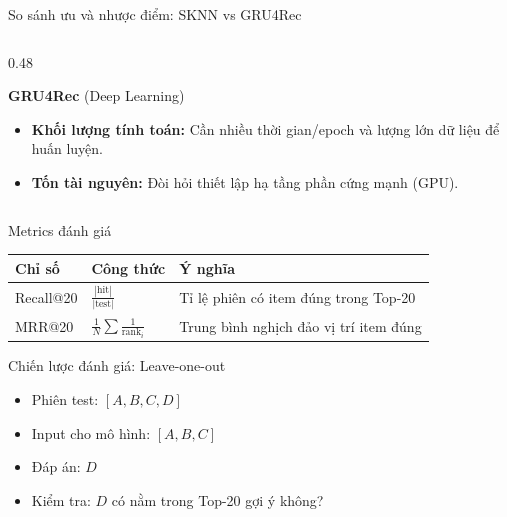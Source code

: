 \documentclass[aspectratio=169, 11pt]{beamer}
\begin{document}
\begin{frame}{So sánh ưu và nhược điểm: SKNN vs GRU4Rec}
\begin{columns}[t]
\begin{column}{0.48\textwidth}
\begin{block}{\textbf{GRU4Rec} (Deep Learning)}
                \vspace{0.03cm}
                \textbf{\color{red!70!black}{Nhược điểm:}}
                \begin{itemize}
                    \item \textbf{Khối lượng tính toán:} Cần nhiều thời gian/epoch và lượng lớn dữ liệu để huấn luyện.
                    \item \textbf{Tốn tài nguyên:} Đòi hỏi thiết lập hạ tầng phần cứng mạnh (GPU).
                \end{itemize}
            \end{block}
        \end{column}

    \end{columns}
\end{frame}

\begin{frame}{Metrics đánh giá}
\begin{table}
\centering
\begin{tabular}{lll}
\toprule
\textbf{Chỉ số} & \textbf{Công thức} & \textbf{Ý nghĩa} \\
\midrule
Recall@20 & $\frac{|\text{hit}|}{|\text{test}|}$ & Tỉ lệ phiên có item đúng trong Top-20 \\[0.3cm]
MRR@20 & $\frac{1}{N}\sum \frac{1}{\text{rank}_i}$ & Trung bình nghịch đảo vị trí item đúng \\
\bottomrule
\end{tabular}
\end{table}

\vspace{0.5cm}
\begin{block}{Chiến lược đánh giá: Leave-one-out}
\begin{itemize}
    \item Phiên test: $[A, B, C, D]$
    \item Input cho mô hình: $[A, B, C]$
    \item Đáp án: $D$
    \item Kiểm tra: $D$ có nằm trong Top-20 gợi ý không?
\end{itemize}
\end{block}
\end{frame}
\end{document}
